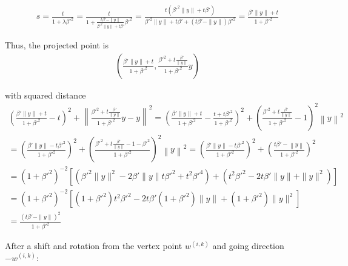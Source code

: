 \documentclass{article}
\theoremstyle{case}
\numberwithin{theorem}{subsection}
\newcommand{\wik}{{w^{(i, k)}}}
\begin{document}
\begin{align*}
s = \frac {t}{1 + \lambda{\beta'}^2 } 
= \frac {t}{1 +\frac{t{\beta'} - \|y\|}{{\beta'}^2\|y\| + t{\beta'}}{\beta'}^2 } 
= \frac {t\left({\beta'}^2\|y\| + t{\beta'}\right)}{{\beta'}^2\|y\| + t{\beta'} + \left(t{\beta'} - \|y\|\right){\beta'}^2 } 
= \frac {{\beta'}\|y\| + t}{1 + {\beta'}^2 } 
\end{align*}


Thus, the projected point is
\begin{align*}
\left(\frac{{\beta'} \|y\| + t}{1 + {\beta'} ^ 2}, \frac{{\beta'} ^ 2 + t \frac {{\beta'}}{\|y\|}}{1 + {\beta'} ^ 2}y\right)
\end{align*}

with squared distance
\begin{align*}
\left(\frac{{\beta'} \|y\| + t}{1 + {\beta'} ^ 2} - t\right)^2 + \left\|\frac{{\beta'} ^ 2 + t \frac {{\beta'}}{\|y\|}}{1 + {\beta'} ^ 2}y - y\right\|^2
= \left(\frac{{\beta'} \|y\| + t}{1 + {\beta'} ^ 2} - \frac{t + t{\beta'} ^ 2}{1 + {\beta'} ^ 2}\right)^2 + \left(\frac{{\beta'} ^ 2 + t \frac {{\beta'}}{\|y\|}}{1 + {\beta'} ^ 2} - 1\right)^2\left\|y\right\|^2 \\
= \left(\frac{{\beta'} \|y\| - t{\beta'}^2}{1 + {\beta'} ^ 2}\right)^2 + \left(\frac{{\beta'} ^ 2 + t \frac {{\beta'}}{\|y\|} - 1 - {\beta'} ^ 2}{1 + {\beta'} ^ 2}\right)^2\left\|y\right\|^2 
= \left(\frac{{\beta'} \|y\| - t{\beta'}^2}{1 + {\beta'} ^ 2}\right)^2 + \left(\frac{t {\beta'} - \left\|y\right\|}{1 + {\beta'} ^ 2}\right)^2 \\
= \left(1 + {\beta'}^2\right)^{-2}\left[\left({\beta'}^2 \|y\|^2 - 2\beta' \|y\| t {\beta'}^2  + t^2 {\beta'}^4\right) + \left(t^2{\beta'}^2 - 2 t {\beta'} \|y\| + \|y\|^2\right) \right] \\
= \left(1 + {\beta'}^2\right)^{-2}\left[
\left(1 + {\beta'}^2\right)t^2{\beta'}^2 - 2t{\beta'}\left(1 + {\beta'}^2\right) \|y\| + \left(1 + {\beta'}^2\right)\|y\|^2
\right] \\
= \frac{\left(t \beta' - \|y\|\right)^2}{1 + {\beta'}^2}
\end{align*}

After a shift and rotation from the vertex point $\wik$ and going direction $-\wik$:
\end{document}
